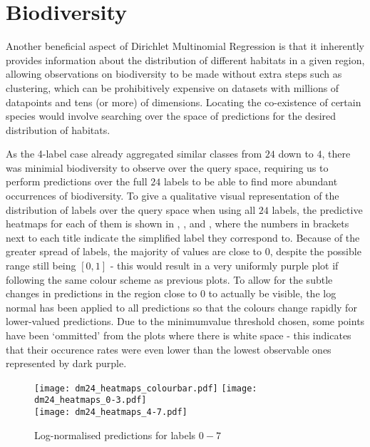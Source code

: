 \pagebreak
\section{Biodiversity}

Another beneficial aspect of Dirichlet Multinomial Regression is that it inherently provides information about the distribution of different habitats in a given region, allowing observations on biodiversity to be made without extra steps such as clustering, which can be prohibitively expensive on datasets with millions of datapoints and tens (or more) of dimensions. Locating the co-existence of certain species would involve searching over the space of predictions for the desired distribution of habitats. 

As the 4-label case already aggregated similar classes from $24$ down to $4$, there was minimial biodiversity to observe over the query space, requiring us to perform predictions over the full $24$ labels to be able to find more abundant occurrences of biodiversity. To give a qualitative visual representation of the distribution of labels over the query space when using all $24$ labels, the predictive heatmaps for each of them is shown in , , and , where the numbers in brackets next to each title indicate the simplified label they correspond to. Because of the greater spread of labels, the majority of values are close to $0$, despite the possible range still being $[0,1]$ - this would result in a very uniformly purple plot if following the same colour scheme as previous plots. To allow for the subtle changes in predictions in the region close to $0$ to actually be visible, the log normal has been applied to all predictions so that the colours change rapidly for lower-valued predictions. Due to the minimumvalue threshold chosen, some points have been `ommitted' from the plots where there is white space - this indicates that their occurence rates were even lower than the lowest observable ones represented by dark purple.

\begin{figure}
    \texttt{[image: dm24\_heatmaps\_colourbar.pdf]}
    \texttt{[image: dm24\_heatmaps\_0-3.pdf]}\\
    \texttt{[image: dm24\_heatmaps\_4-7.pdf]}
    \caption{Log-normalised predictions for labels $0-7$}
    \label{fig:dm24_0-7}
\end{figure}

